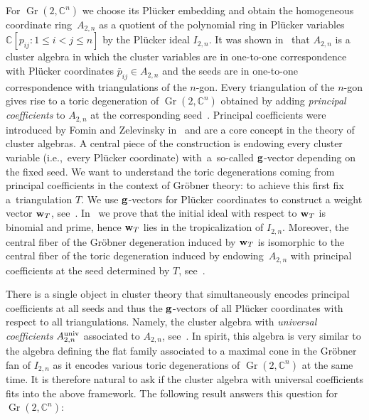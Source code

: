 \documentclass[pdftex]{sigma}%
\numberwithin{equation}{section}
\DeclareMathOperator{\Gr}{Gr}
\begin{document}
 For $\Gr(2,\mathbb C^n)$ we choose its Pl\"ucker embedding and obtain the homogeneous coordinate ring~$A_{2,n}$ as a quotient of the polynomial ring in Pl\"ucker variables $\mathbb C[p_{ij}\colon 1\le i<j\le n]$ by the Pl\"ucker ideal $I_{2,n}$.
It was shown in~\cite{FZ02} that $A_{2,n}$ %
is a cluster algebra in which the cluster variables are in one-to-one correspondence with Pl\"ucker coordinates $\bar p_{ij}\in A_{2,n}$ and the
seeds are in one-to-one correspondence with triangulations of the $n$-gon.
Every triangulation of the $n$-gon gives rise to a toric degeneration of $\Gr(2,\mathbb C^n)$ obtained by adding {\it principal coefficients} to $A_{2,n}$ at the corresponding seed~\cite{GHKK}.
Principal coefficients were introduced by Fomin and Zelevinsky in~\cite{FZ_clustersIV} and are a core concept in the theory of cluster algebras.
A central piece of the construction is endowing every cluster variable (i.e.,~every Pl\"ucker coordinate) with~a~so-called ${\bf g}$-vector depending on the fixed seed.
We want to understand the toric degenerations coming from principal coefficients in the context of Gr\"obner theory:
to achieve this first fix a~triangulation $T$.
We use ${\bf g}$-vectors for Pl\"ucker coordinates to construct a weight vector ${\bf w}_T$, see~.
In~ we prove that the initial ideal with respect to ${\bf w}_T$ is binomial and prime, hence ${\bf w}_T$ lies in the tropicalization of $I_{2,n}$.
Moreover, the central fiber of the Gr\"obner degeneration induced by ${\bf w}_T$ is isomorphic to the central fiber of the toric degeneration induced by endowing~$A_{2,n}$ with principal coefficients at the seed determined by $T$, see~.


There is a single object in cluster theory that simultaneously encodes principal coefficients at all seeds and thus the ${\bf g}$-vectors of all Pl\"ucker coordinates with respect to all triangulations.
Namely, the cluster algebra with {\it universal coefficients} $A^{\rm univ}_{2,n}$ associated to $A_{2,n}$, see~.
In spirit, this algebra is very similar to the algebra defining the flat family associated to a maximal cone in the Gr\"obner fan of $I_{2,n}$ as it encodes various toric degenerations of $\Gr(2,\mathbb C^n)$ at the same time.
It is therefore natural to ask if the cluster algebra with universal coefficients fits into the above framework.
The following result answers this question %
for $\Gr(2,\mathbb C^n)$:
\end{document}
